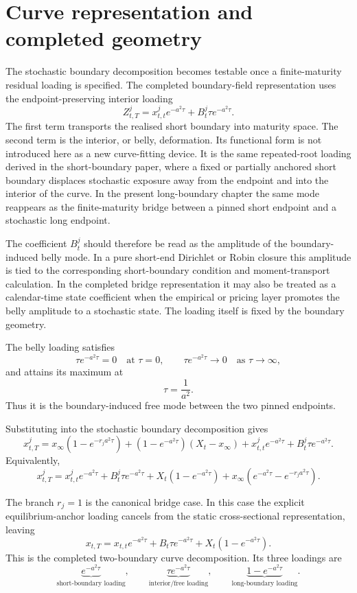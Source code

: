 \documentclass[11pt]{article}
\begin{document}
\section{Curve representation and completed geometry}

The stochastic boundary decomposition becomes testable once a finite-maturity residual loading is specified. The completed boundary-field representation uses the endpoint-preserving interior loading
\[
Z^j_{t,T}
=
x^j_{t,t}e^{-a^2\tau}
+
B^j_t\tau e^{-a^2\tau}.
\]
The first term transports the realised short boundary into maturity space. The second term is the interior, or belly, deformation. Its functional form is not introduced here as a new curve-fitting device. It is the same repeated-root loading derived in the short-boundary paper, where a fixed or partially anchored short boundary displaces stochastic exposure away from the endpoint and into the interior of the curve. In the present long-boundary chapter the same mode reappears as the finite-maturity bridge between a pinned short endpoint and a stochastic long endpoint.

The coefficient \(B^j_t\) should therefore be read as the amplitude of the boundary-induced belly mode. In a pure short-end Dirichlet or Robin closure this amplitude is tied to the corresponding short-boundary condition and moment-transport calculation. In the completed bridge representation it may also be treated as a calendar-time state coefficient when the empirical or pricing layer promotes the belly amplitude to a stochastic state. The loading itself is fixed by the boundary geometry.

The belly loading satisfies
\[
\tau e^{-a^2\tau}=0
\quad\text{at }\tau=0,
\qquad
\tau e^{-a^2\tau}\to0
\quad\text{as }\tau\to\infty,
\]
and attains its maximum at
\[
\tau=\frac{1}{a^2}.
\]
Thus it is the boundary-induced free mode between the two pinned endpoints.

Substituting into the stochastic boundary decomposition gives
\[
x^j_{t,T}
=
x_\infty\left(1-e^{-r_j a^2\tau}\right)
+
\left(1-e^{-a^2\tau}\right)(X_t-x_\infty)
+
x^j_{t,t}e^{-a^2\tau}
+
B^j_t\tau e^{-a^2\tau}.
\]
Equivalently,
\[
x^j_{t,T}
=
x^j_{t,t}e^{-a^2\tau}
+
B^j_t\tau e^{-a^2\tau}
+
X_t\left(1-e^{-a^2\tau}\right)
+
x_\infty\left(e^{-a^2\tau}-e^{-r_j a^2\tau}\right).
\]

The branch \(r_j=1\) is the canonical bridge case. In this case the explicit equilibrium-anchor loading cancels from the static cross-sectional representation, leaving
\[
x_{t,T}
=
x_{t,t}e^{-a^2\tau}
+
B_t\tau e^{-a^2\tau}
+
X_t\left(1-e^{-a^2\tau}\right).
\]
This is the completed two-boundary curve decomposition. Its three loadings are
\[
\underbrace{e^{-a^2\tau}}_{\text{short-boundary loading}},
\qquad
\underbrace{\tau e^{-a^2\tau}}_{\text{interior/free loading}},
\qquad
\underbrace{1-e^{-a^2\tau}}_{\text{long-boundary loading}}.
\]
\end{document}
